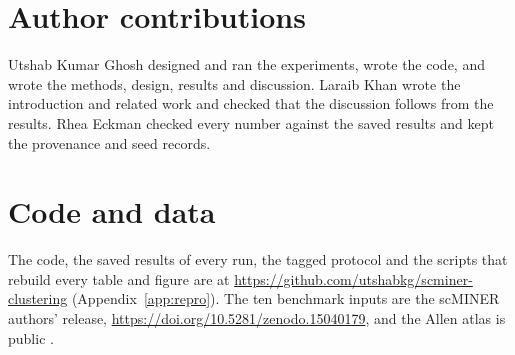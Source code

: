 \section*{Author contributions}
Utshab Kumar Ghosh designed and ran the experiments, wrote the code, and wrote the methods, design,
results and discussion. Laraib Khan wrote the introduction and related work and checked that the discussion
follows from the results. Rhea Eckman checked every number against the saved results and kept the
provenance and seed records.

\section*{Code and data}
The code, the saved results of every run, the tagged protocol and the scripts that rebuild every table and
figure are at \url{https://github.com/utshabkg/scminer-clustering} (Appendix~\ref{app:repro}). The ten
benchmark inputs are the scMINER authors' release, \url{https://doi.org/10.5281/zenodo.15040179}, and the
Allen atlas is public \cite{yao2023allen}.
